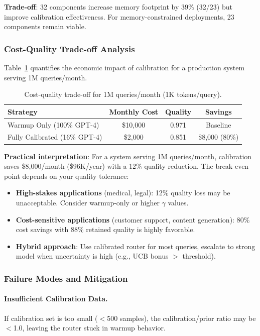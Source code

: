 \textbf{Trade-off}: 32 components increase memory footprint by 39\% (32/23) but improve calibration effectiveness. For memory-constrained deployments, 23 components remain viable.

\subsubsection{Cost-Quality Trade-off Analysis}

Table~\ref{tab:cost-quality-tradeoff} quantifies the economic impact of calibration for a production system serving 1M queries/month.

\begin{table}[t]
\centering
\caption{Cost-quality trade-off for 1M queries/month (1K tokens/query).}
\label{tab:cost-quality-tradeoff}
\begin{tabular}{lccc}
\toprule
\textbf{Strategy} & \textbf{Monthly Cost} & \textbf{Quality} & \textbf{Savings} \\
\midrule
Warmup Only (100\% GPT-4) & \$10,000 & 0.971 & Baseline \\
Fully Calibrated (16\% GPT-4) & \$2,000 & 0.851 & \$8,000 (80\%) \\
\bottomrule
\end{tabular}
\end{table}

\textbf{Practical interpretation}: For a system serving 1M queries/month, calibration saves \$8,000/month (\$96K/year) with a 12\% quality reduction. The break-even point depends on your quality tolerance:
\begin{itemize}
    \item \textbf{High-stakes applications} (medical, legal): 12\% quality loss may be unacceptable. Consider warmup-only or higher $\gamma$ values.
    \item \textbf{Cost-sensitive applications} (customer support, content generation): 80\% cost savings with 88\% retained quality is highly favorable.
    \item \textbf{Hybrid approach}: Use calibrated router for most queries, escalate to strong model when uncertainty is high (e.g., UCB bonus $>$ threshold).
\end{itemize}

\subsubsection{Failure Modes and Mitigation}

\paragraph{Insufficient Calibration Data.} If calibration set is too small ($<$500 samples), the calibration/prior ratio may be $<$1.0, leaving the router stuck in warmup behavior.

